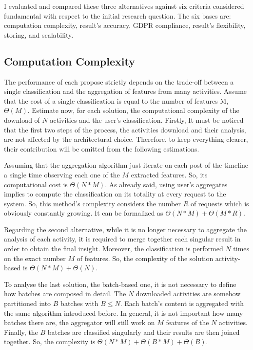 I evaluated and compared these three alternatives against six criteria considered fundamental with respect to the initial research question.
The six bases are: computation complexity, result's accuracy, GDPR compliance, result's flexibility, storing, and scalability.

\subsection{Computation Complexity}
The performance of each propose strictly depends on the trade-off between a single classification and the aggregation of features from many activities.
Assume that the cost of a single classification is equal to the number of features M, $\Theta(M)$.
Estimate now, for each solution, the computational complexity of the download of $N$ activities and the user's classification.
Firstly, It must be noticed that the first two steps of the process, the activities download and their analysis, are not affected by the architectural choice. Therefore, to keep everything clearer, their contribution will be omitted from the following estimations.

Assuming that the aggregation algorithm just iterate on each post of the timeline a single time observing each one of the $M$ extracted features. So, its computational cost is $\Theta(N*M)$.
As already said, using user's aggregates implies to compute the classification on its totality at every request to the system. So, this method's complexity considers the number $R$ of requests which is obviously constantly growing. 
It can be formalized as \textbf{$\Theta(N*M) + \Theta(M*R)$}.

Regarding the second alternative, while it is no longer necessary to aggregate the analysis of each activity, it is required to merge together each singular result in order to obtain the final insight.
Moreover, the classification is performed $N$ times on the exact number $M$ of features.
So, the complexity of the solution activity-based is \textbf{$\Theta(N*M) + \Theta(N)$}.

To analyse the last solution, the batch-based one, it is not necessary to define how batches are composed in detail.
The $N$ downloaded activities are somehow partitioned into $B$ batches with $B \leq N$.
Each batch's content is aggregated with the same algorithm introduced before. In general, it is not important how many batches there are, the aggregator will still work on $M$ features of the $N$ activities.
Finally, the $B$ batches are classified singularly and their results are then joined together.
So, the complexity is \textbf{$\Theta(N*M) + \Theta(B*M) + \Theta(B)$}.

